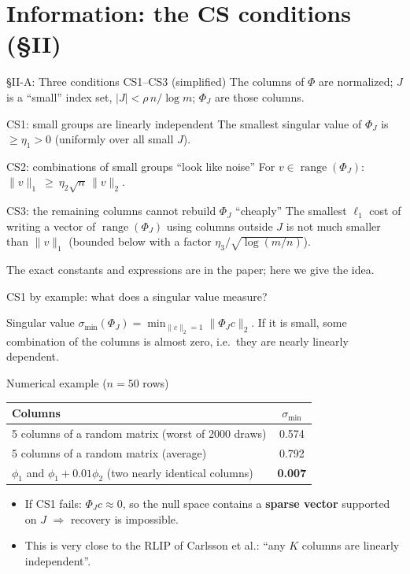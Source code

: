\documentclass[aspectratio=169,11pt]{beamer}
\newcommand{\norm}[1]{\lVert #1\rVert}
\begin{document}
\section{Information: the CS conditions (\S II)}

\begin{frame}{\S II-A: Three conditions CS1--CS3 (simplified)}
  The columns of $\Phi$ are normalized; $J$ is a ``small'' index set, $|J|<\rho\,n/\log m$; $\Phi_J$ are those columns.
  \begin{block}{CS1: small groups are linearly independent}
    The smallest singular value of $\Phi_J$ is $\ge\eta_1>0$ (uniformly over all small $J$).
  \end{block}
  \begin{block}{CS2: combinations of small groups ``look like noise''}
    For $v\in\operatorname{range}(\Phi_J)$: \ $\norm{v}_1\ \ge\ \eta_2\sqrt n\,\norm{v}_2$.
  \end{block}
  \begin{block}{CS3: the remaining columns cannot rebuild $\Phi_J$ ``cheaply''}
    The smallest $\ell_1$ cost of writing a vector of $\operatorname{range}(\Phi_J)$ using columns outside $J$
    is not much smaller than $\norm{v}_1$ (bounded below with a factor $\eta_3/\sqrt{\log(m/n)}$).
  \end{block}
  {\footnotesize The exact constants and expressions are in the paper; here we give the idea.}
\end{frame}

\begin{frame}{CS1 by example: what does a singular value measure?}
  \begin{block}{Singular value}
    $\sigma_{\min}(\Phi_J)=\min_{\norm{c}_2=1}\norm{\Phi_Jc}_2$. If it is small, some combination of the columns is almost zero, i.e.\ they are nearly linearly dependent.
  \end{block}
  \begin{exampleblock}{Numerical example ($n=50$ rows)}
    \centering
    \begin{tabular}{@{}lc@{}}
      \toprule
      Columns & $\sigma_{\min}$ \\
      \midrule
      5 columns of a random matrix (worst of 2000 draws) & 0.574 \\
      5 columns of a random matrix (average) & 0.792 \\
      $\phi_1$ and $\phi_1+0.01\phi_2$ (two nearly identical columns) & \textbf{0.007} \\
      \bottomrule
    \end{tabular}
  \end{exampleblock}
  \begin{itemize}
    \item If CS1 fails: $\Phi_J c\approx0$, so the null space contains a \textbf{sparse vector} supported on $J$ $\Rightarrow$ recovery is impossible.
    \item This is very close to the RLIP of Carlsson et al.: ``any $K$ columns are linearly independent''.
  \end{itemize}
\end{frame}
\end{document}
